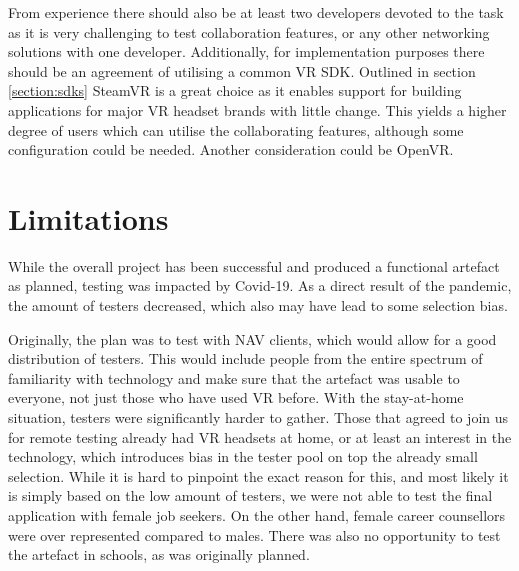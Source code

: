 From experience there should also be at least two developers devoted to the task as it is very challenging to test collaboration features, or any other networking solutions with one developer. Additionally, for implementation purposes there should be an agreement of utilising a common VR SDK. Outlined in section \ref{section:sdks} SteamVR is a great choice as it enables support for building applications for major VR headset brands with little change. This yields a higher degree of users which can utilise the collaborating features, although some configuration could be needed. Another consideration could be OpenVR.











\section{Limitations}
While the overall project has been successful and produced a functional artefact as planned, testing was impacted by Covid-19. As a direct result of the pandemic, the amount of testers decreased, which also may have lead to some selection bias.

Originally, the plan was to test with NAV clients, which would allow for a good distribution of testers. This would include people from the entire spectrum of familiarity with technology and make sure that the artefact was usable to everyone, not just those who have used VR before. With the stay-at-home situation, testers were significantly harder to gather. Those that agreed to join us for remote testing already had VR headsets at home, or at least an interest in the technology, which introduces bias in the tester pool on top the already small selection. While it is hard to pinpoint the exact reason for this, and most likely it is simply based on the low amount of testers, we were not able to test the final application with female job seekers. On the other hand, female career counsellors were over represented compared to males. There was also no opportunity to test the artefact in schools, as was originally planned.









\cleardoublepage